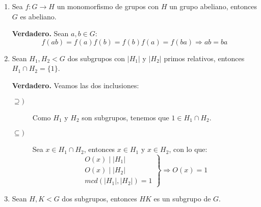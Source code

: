 \documentclass[12pt]{article}
\begin{document}
\begin{ejercicio}
\begin{enumerate}
            \item Sea $f:G\to H$ un monomorfismo de grupos con $H$ un grupo abeliano, entonces $G$ es abeliano.

                \textbf{Verdadero.} Sean $a,b\in G$:
                \begin{equation*}
                    f(ab) = f(a)f(b) = f(b)f(a) = f(ba) \Longrightarrow ab = ba
                \end{equation*}
            \item Sean $H_1,H_2<G$ dos subgrupos con $|H_1|$ y $|H_2|$ primos relativos, entonces $H_1\cap H_2 = \{1\}$.

                \textbf{Verdadero.} Veamos las dos inclusiones:
                \begin{description}
                    \item [$\supseteq)$] Como $H_1$ y $H_2$ son subgrupos, tenemos que $1\in H_1\cap H_2$.
                    \item [$\subseteq)$] Sea $x\in H_1\cap H_2$, entonces $x\in H_1$ y $x\in H_2$, con lo que:
                        \begin{equation*}
                            \left.\begin{array}{r}
                                O(x) \mid |H_1| \\
                                O(x) \mid |H_2| \\
                                mcd(|H_1|,|H_2|) = 1
                            \end{array}\right\} \Longrightarrow  O(x) = 1
                        \end{equation*}
                \end{description}
            \item Sean $H,K<G$ dos subgrupos, entonces $HK$ es un subgrupo de $G$.


\end{enumerate}
\end{ejercicio}
\end{document}
